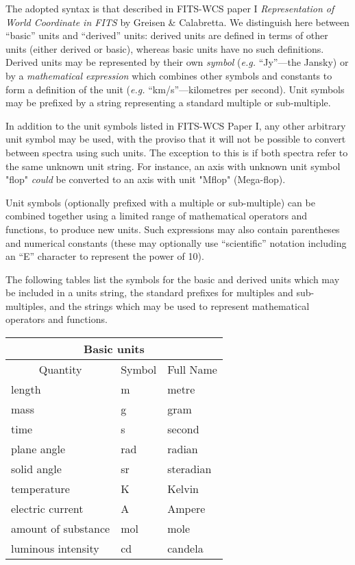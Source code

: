 \documentclass[twoside,11pt,nolof]{starlink}
\begin{document}
The adopted syntax is that described in FITS-WCS paper I \textit{Representation
of World Coordinate in FITS} by Greisen \& Calabretta. We distinguish
here between ``basic'' units and ``derived'' units: derived units are
defined in terms of other units (either derived or basic), whereas basic
units have no such definitions. Derived units may be represented by their
own \emph{symbol} (\emph{e.g.} ``Jy''---the Jansky) or by a
\emph{mathematical expression} which combines other symbols and constants
to form a definition of the unit (\emph{e.g.} ``km/s''---kilometres per
second). Unit symbols may be prefixed by a string representing a standard
multiple or sub-multiple.

In addition to the unit symbols listed in FITS-WCS Paper I, any other
arbitrary unit symbol may be used, with the proviso that it will not be
possible to convert between spectra using such units. The exception to
this is if both spectra refer to the same unknown unit string. For instance,
an axis with unknown unit symbol "flop" \emph{could} be converted to an axis
with unit "Mflop" (Mega-flop).

Unit symbols (optionally prefixed with a multiple or sub-multiple) can be
combined together using a limited range of mathematical operators and
functions, to produce new units. Such expressions may also contain
parentheses and numerical constants (these may optionally use
``scientific'' notation including an ``E'' character to represent the
power of 10).

The following tables list the symbols for the basic and derived units which
may be included in a units string, the standard prefixes for multiples
and sub-multiples, and the strings which may be used to represent
mathematical operators and functions.

\begin{center}
\begin{tabular}{|l|l|l|}
\hline
\multicolumn{3}{|c|}{{\large Basic units}} \\ \hline
\multicolumn{1}{|c|}{Quantity} & \multicolumn{1}{|c|}{Symbol} &
\multicolumn{1}{c|}{Full Name} \\ \hline
length              & m   & metre \\
mass                & g   & gram \\
time                & s   & second \\
plane angle         & rad & radian \\
solid angle         & sr  & steradian \\
temperature         & K   & Kelvin \\
electric current    & A   & Ampere \\
amount of substance & mol & mole \\
luminous intensity  & cd  & candela \\
\hline
\end{tabular}
\end{center}
\end{document}
